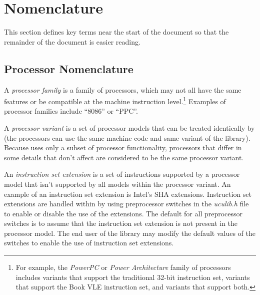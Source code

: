 \section{Nomenclature}
\label{ciov0:snom0}

This section defines key terms near the start of the 
document so that the remainder of the document is easier 
reading.  


\subsection{Processor Nomenclature}
\label{ciov0:snom0:sptr0}

A \emph{processor family} is a 
family of processors, which may not all have the same 
features or be compatible at the machine instruction 
level.\footnote{For example, the \emph{PowerPC} or 
\emph{Power Architecture} family of processors includes 
variants that support the traditional 32-bit instruction 
set, variants that support the Book VLE instruction set, and 
variants that support both.} Examples of processor families 
include ``8086'' or ``PPC''.  

A \emph{processor variant} is a set 
of processor models that can be treated identically by 
\emph{\productbasenameshort{}} (the processors can use the 
same machine code and same variant of the 
\emph{\productbasenameshort{}} library).  Because 
\emph{\productbasenameshort{}} uses only a subset of 
processor functionality, processors that differ in some 
details that don't affect \emph{\productbasenameshort{}} are 
considered to be the same processor variant.  

An \emph{instruction set 
extension} is a set of instructions supported by a processor 
model that isn't supported by all models within the 
processor variant.  An example of an instruction set 
extension is Intel's SHA extensions.  Instruction set 
extensions are handled within \emph{\productbasenameshort{}} 
by using preprocessor switches in the \emph{uculib.h} file 
to enable or disable the use of the extensions.  The default
for all preprocessor switches is to assume that the 
instruction set extension is not present in the processor 
model.  The end user of the library may modify the default 
values of the switches to enable the use of instruction set 
extensions.


